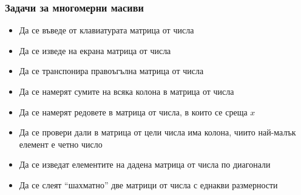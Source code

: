 \documentclass[alsotrans]{beamerswitch}
\begin{document}
\begin{frame}
  \frametitle{Задачи за многомерни масиви}
  
  \begin{itemize}[<+->]
  \item Да се въведе от клавиатурата матрица от числа
  \item Да се изведе на екрана матрица от числа
  \item Да се транспонира правоъгълна матрица от числа
  \item Да се намерят сумите на всяка колона в матрица от числа
  \item Да се намерят редовете в матрица от числа, в които се среща $x$
  \item Да се провери дали в матрица от цели числа има колона, чиито най-малък елемент е четно число
  \item Да се изведат елементите на дадена матрица от числа по диагонали
  \item Да се слеят ``шахматно'' две матрици от числа с еднакви размерности
  \end{itemize}
\end{frame}
\end{document}
